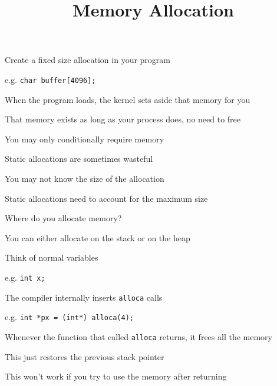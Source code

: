 

\title{Memory Allocation}


  \begin{frame}
    \titlepage
  \end{frame}

  \begin{slide}


    Create a fixed size allocation in your program

    \leftspace{}e.g. \texttt{char buffer[4096];}
    \medskip

    When the program loads, the kernel sets aside that memory
    for you
    \medskip

    That memory exists as long as your process does, no need to free

  \end{slide}

  \begin{slide}


    You may only conditionally require memory

    \leftspace{}Static allocations are sometimes wasteful
    \medskip

    You may not know the size of the allocation

    \leftspace{}Static allocations need to account for the maximum size
    \medskip

    Where do you allocate memory?

    \leftspace{}You can either allocate on the stack or on the heap

  \end{slide}

  \begin{slide}


    Think of normal variables

    \leftspace{}e.g. \texttt{int x;}
    \medskip

    The compiler internally inserts \texttt{alloca} calls

    \leftspace{}e.g. \texttt{int *px = (int*) alloca(4);}
    \medskip

    Whenever the function that called \texttt{alloca} returns, it
    frees all the memory

    \leftspace{}This just restores the previous stack pointer
    \medskip

    This won't work if you try to use the memory after returning

  \end{slide}

